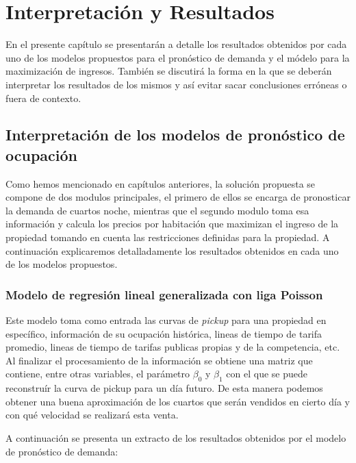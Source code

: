 \chapter{Interpretación y Resultados}
\label{ch:results}

En el presente capítulo se presentarán a detalle los resultados obtenidos por cada uno de los modelos propuestos para el pronóstico de demanda y el módelo para la maximización de ingresos. También se discutirá la forma en la que se deberán interpretar los resultados de los mismos y así evitar sacar conclusiones erróneas o fuera de contexto.

\section*{Interpretación de los modelos de pronóstico de ocupación}
Como hemos mencionado en capítulos anteriores, la solución propuesta se compone de dos modulos principales, el primero de ellos se encarga de pronosticar la demanda de cuartos noche, mientras que el segundo modulo toma esa información y calcula los precios por habitación  que  maximizan  el  ingreso  de  la  propiedad  tomando  en  cuenta  las restricciones definidas para la propiedad. A continuación explicaremos detalladamente los resultados obtenidos en cada uno de los modelos propuestos.


\subsection*{Modelo de regresión lineal generalizada con liga Poisson}

Este modelo toma como entrada las curvas de \emph{pickup} para una propiedad en específico, información de su ocupación histórica, lineas de tiempo de tarifa promedio, lineas de tiempo de tarifas publicas propias y de la competencia, etc. Al finalizar el procesamiento de la información se obtiene una matriz que contiene, entre otras variables, el parámetro $\beta_0$ y $\beta_1$ con el que se puede reconstruír la curva de pickup para un día futuro. De esta manera podemos obtener una buena aproximación de los cuartos que serán vendidos en cierto día y con qué velocidad se realizará esta venta.

A continuación se presenta un extracto de los resultados obtenidos por el modelo de pronóstico de demanda:

